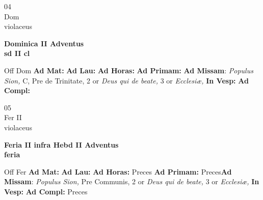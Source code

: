 \documentclass[10pt, openany]{book}
\begin{document}
    \begin{center}
        \begin{minipage}{3.5in}
            \vspace{2em}
            \begin{minipage}{0.5in}
                {\Huge 04} \\
                {\normalsize Dom} \\
                {\normalsize violaceus}
            \end{minipage}
            \begin{minipage}{3.0in}
                \textbf{ \large Dominica II Adventus \\
                \textnormal{\normalsize sd II cl}} \\ 
            \end{minipage}
            \begin{justify}Off Dom
                \textbf{Ad Mat: }
                \textbf{Ad Lau: }
                \textbf{Ad Horas: }
                \textbf{Ad Primam: }\textbf{Ad Missam}: \textit{Populus Sion,} C, Pre de Trinitate, 2 or \textit{Deus qui de beate,} 3 or \textit{Ecclesiæ,}  
                \textbf{In Vesp: }
                \textbf{Ad Compl: }
            \end{justify}
        \end{minipage}
    \end{center}

    \begin{center}
        \begin{minipage}{3.5in}
            \vspace{2em}
            \begin{minipage}{0.5in}
                {\Huge 05} \\
                {\normalsize Fer II} \\
                {\normalsize violaceus}
            \end{minipage}
            \begin{minipage}{3.0in}
                \textbf{ \large Feria II infra Hebd II Adventus \\
                \textnormal{\normalsize feria}} \\ 
            \end{minipage}
            \begin{justify}Off Fer
                \textbf{Ad Mat: }
                \textbf{Ad Lau: }
                \textbf{Ad Horas: }Preces
                \textbf{Ad Primam: }Preces\textbf{Ad Missam}: \textit{Populus Sion,} Pre Communis, 2 or \textit{Deus qui de beate,} 3 or \textit{Ecclesiæ,}  
                \textbf{In Vesp: }
                \textbf{Ad Compl: }Preces
            \end{justify}
        \end{minipage}
    \end{center}
\end{document}
